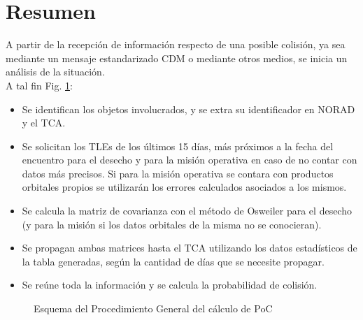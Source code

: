 \section*{Resumen}
A partir de la recepci\'on de informaci\'on respecto de una posible colisi\'on, ya sea mediante un mensaje estandarizado CDM o mediante otros medios, se inicia un an\'alisis de la situaci\'on.\\
A tal fin Fig. \ref{fig:flujomain}:\\
\begin{itemize}
\itemsep0em
\item Se identifican los objetos involucrados, y se extra su identificador en NORAD y el TCA.
\item Se solicitan los TLEs de los \'ultimos 15 d\'ias, m\'as pr\'oximos a la fecha del encuentro para el desecho y para la misi\'on operativa en caso de no contar con datos m\'as precisos. Si para la misi\'on operativa se contara con productos orbitales propios se utilizar\'an los errores calculados asociados a los mismos.
\item Se calcula la matriz de covarianza con el m\'etodo de Osweiler para el desecho (y para la misi\'on si los datos orbitales de la misma no se conocieran).
\item Se propagan ambas matrices hasta el TCA utilizando los datos estad\'isticos de la tabla generadas, seg\'un la cantidad de d\'ias que se necesite propagar.
\item Se re\'une toda la informaci\'on y se calcula la probabilidad de colisi\'on.
\end{itemize}

\begin{figure}[!h]
\centering
{}
\caption[Esquema del Procedimiento General del c\'alculo de PoC]{Esquema del Procedimiento General del c\'alculo de PoC}
\label{fig:flujomain}
\end{figure}

\endinput